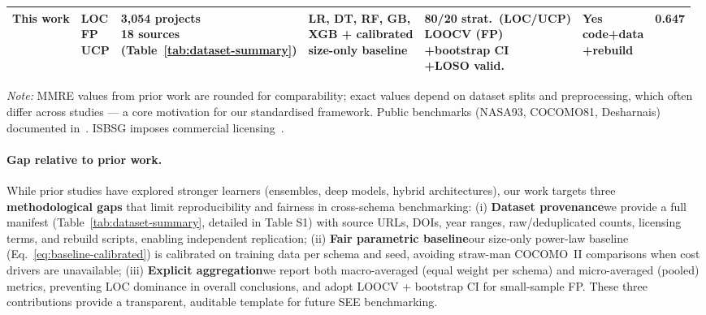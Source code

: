 \documentclass{ieeeaccess}
\begin{document}
\begin{table}[ht]
\begin{tabular}{@{}p{2.5cm}p{1.2cm}p{2.4cm}p{2.3cm}p{2.3cm}p{0.9cm}p{1.5cm}@{}}
\midrule
\textbf{This work} & \makecell[l]{LOC\\FP\\UCP} & \makecell[l]{3,054 projects\\18 sources\\(Table~\ref{tab:dataset-summary})} & \makecell[l]{LR, DT, RF, GB,\\XGB + calibrated\\size-only baseline} & \makecell[l]{80/20 strat.\ (LOC/UCP)\\LOOCV (FP)\\+bootstrap CI\\+LOSO valid.} & \makecell[l]{\textbf{Yes}\\code+data\\+rebuild} & \textbf{0.647} \\
\bottomrule
\end{tabular}
\vspace{0.3em}
\raggedright\footnotesize
\textit{Note:} MMRE values from prior work are rounded for comparability; exact values depend on dataset splits and preprocessing, which often differ across studies --- a core motivation for our standardised framework. Public benchmarks (NASA93, COCOMO81, Desharnais) documented in~\cite{jones2022estimation,rodriguez2023dase}. ISBSG imposes commercial licensing~\cite{isbsg2025overview}.
\end{table}

\paragraph{Gap relative to prior work.}
While prior studies have explored stronger learners (ensembles, deep models, hybrid architectures), our work targets three \textbf{methodological gaps} that limit reproducibility and fairness in cross-schema benchmarking:
(i) \textbf{Dataset provenance}\textemdash we provide a full manifest (Table~\ref{tab:dataset-summary}, detailed in Table S1) with source URLs, DOIs, year ranges, raw/deduplicated counts, licensing terms, and rebuild scripts, enabling independent replication;
(ii) \textbf{Fair parametric baseline}\textemdash our size-only power-law baseline (Eq.~\ref{eq:baseline-calibrated}) is calibrated on training data per schema and seed, avoiding straw-man COCOMO~II comparisons when cost drivers are unavailable;
(iii) \textbf{Explicit aggregation}\textemdash we report both macro-averaged (equal weight per schema) and micro-averaged (pooled) metrics, preventing LOC dominance in overall conclusions, and adopt LOOCV + bootstrap CI for small-sample FP.
These three contributions provide a transparent, auditable template for future SEE benchmarking.
\end{document}
